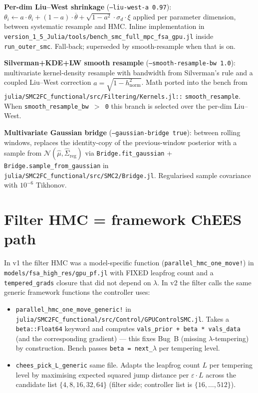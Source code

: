 \documentclass[11pt,a4paper]{article}
\begin{document}
\noindent
\textbf{Per-dim Liu--West shrinkage} (\texttt{--liu-west-a 0.97}):
$\theta_i \leftarrow a \cdot \theta_i + (1 - a) \cdot \overline{\theta} + \sqrt{1 - a^2} \cdot \sigma_d \cdot \xi$
applied per parameter dimension, between systematic resample and
HMC. Inline implementation in
\texttt{version\_1\_5\_Julia/tools/bench\_smc\_full\_mpc\_fsa\_gpu.jl}
inside \texttt{run\_outer\_smc}. Fall-back; superseded by
smooth-resample when that is on.

\noindent
\textbf{Silverman+KDE+LW smooth resample}
(\texttt{--smooth-resample-bw 1.0}): multivariate kernel-density
resample with bandwidth from Silverman's rule and a coupled
Liu--West correction $a = \sqrt{1 - h_{\mathrm{norm}}^2}$. Math
ported into the bench from
\texttt{julia/SMC2FC\_functional/src/Filtering/Kernels.jl::}
\texttt{smooth\_resample}. When \texttt{smooth\_resample\_bw $>$ 0}
this branch is selected over the per-dim Liu--West.

\noindent
\textbf{Multivariate Gaussian bridge}
(\texttt{--gaussian-bridge true}): between rolling windows, replaces
the identity-copy of the previous-window posterior with a sample
from $\mathcal{N}(\hat\mu, \hat\Sigma_{\mathrm{reg}})$ via
\texttt{Bridge.fit\_gaussian} +
\texttt{Bridge.sample\_from\_gaussian} in
\texttt{julia/SMC2FC\_functional/src/SMC2/Bridge.jl}. Regularised
sample covariance with $10^{-6}$ Tikhonov.


\section{Filter HMC = framework ChEES path}
\label{sec:filter_hmc_unified}

In v1 the filter HMC was a model-specific function
(\texttt{parallel\_hmc\_one\_move!}) in
\texttt{models/fsa\_high\_res/gpu\_pf.jl} with FIXED leapfrog count
and a \texttt{tempered\_grads} closure that did not depend on
$\lambda$. In v2 the filter calls the same generic framework
functions the controller uses:

\begin{itemize}[itemsep=2pt]
  \item \texttt{parallel\_hmc\_one\_move\_generic!} in
        \texttt{julia/SMC2FC\_functional/src/Control/GPUControlSMC.jl}.
        Takes a \texttt{beta::Float64} keyword and computes
        \texttt{vals\_prior + beta * vals\_data} (and the
        corresponding gradient) --- this fixes Bug~B (missing
        $\lambda$-tempering) by construction. Bench passes
        \texttt{beta = next\_$\lambda$} per tempering level.
  \item \texttt{chees\_pick\_L\_generic} same file. Adapts the
        leapfrog count $L$ per tempering level by maximising
        expected squared jump distance per $\varepsilon \cdot L$
        across the candidate list
        $\{4, 8, 16, 32, 64\}$ (filter side; controller list is
        $\{16, \ldots, 512\}$).
\end{itemize}
\end{document}
